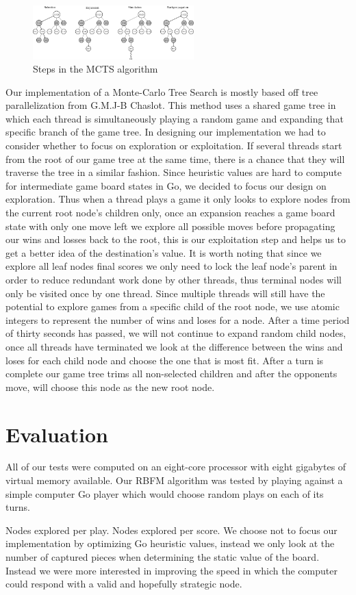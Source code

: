 \documentclass[conference]{IEEEtran}
\begin{document}
\begin{figure}[h]
\includegraphics[width=235px]{MCTS}
\caption{Steps in the MCTS algorithm}
\centering
\end{figure}

Our implementation of a Monte-Carlo Tree Search is mostly based off tree parallelization from G.M.J-B Chaslot. This method uses a shared game tree in which each thread is simultaneously playing a random game and expanding that specific branch of the game tree. In designing our implementation we had to consider whether to focus on exploration or exploitation.  If several threads start from the root of our game tree at the same time, there is a chance that they will traverse the tree in a similar fashion. Since heuristic values are hard to compute for intermediate game board states in Go, we decided to focus our design on exploration. Thus when a thread plays a game it only looks to explore nodes from the current root node's children only, once an expansion reaches a game board state with only one move left we explore all possible moves before propagating our wins and losses back to the root, this is our exploitation step and helps us to get a better idea of the destination's value. It is worth noting that since we explore all leaf nodes final scores we only need to lock the leaf node's parent in order to reduce redundant work done by other threads, thus terminal nodes will only be visited once by one thread. Since multiple threads will still have the potential to explore games from a specific child of the root node, we use atomic integers to represent the number of wins and loses for a node. After a time period of thirty seconds has passed, we will not continue to expand random child nodes, once all threads have terminated we look at the difference between the wins and loses for each child node and choose the one that is most fit. After a turn is complete our game tree trims all non-selected children and after the opponents move, will choose this node as the new root node.

\section{Evaluation}
All of our tests were computed on an eight-core processor with eight gigabytes of virtual memory available. Our RBFM algorithm was tested by playing against a simple computer Go player which would choose random plays on each of its turns. \par
Nodes explored per play.
Nodes explored per score.
We choose not to focus our implementation by optimizing Go heuristic values, instead we only look at the number of captured pieces when determining the static value of the board. Instead we were more interested in improving the speed in which the computer could respond with a valid and hopefully strategic node. 
\end{document}
